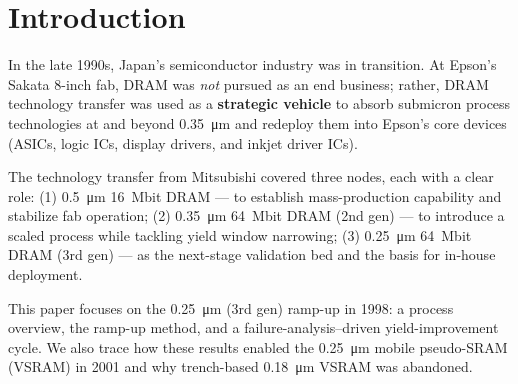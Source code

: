 \section{Introduction}

In the late 1990s, Japan's semiconductor industry was in transition. At Epson's Sakata 8-inch fab, DRAM was \emph{not} pursued as an end business; rather, DRAM technology transfer was used as a \textbf{strategic vehicle} to absorb submicron process technologies at and beyond 0.35~\si{\micro\meter} and redeploy them into Epson's core devices (ASICs, logic ICs, display drivers, and inkjet driver ICs).

The technology transfer from Mitsubishi covered three nodes, each with a clear role:
(1) 0.5~\si{\micro\meter} 16~Mbit DRAM --- to establish mass-production capability and stabilize fab operation; 
(2) 0.35~\si{\micro\meter} 64~Mbit DRAM (2nd gen) --- to introduce a scaled process while tackling yield window narrowing; 
(3) 0.25~\si{\micro\meter} 64~Mbit DRAM (3rd gen) --- as the next-stage validation bed and the basis for in-house deployment.

This paper focuses on the 0.25~\si{\micro\meter} (3rd gen) ramp-up in 1998: a process overview, the ramp-up method, and a failure-analysis–driven yield-improvement cycle. We also trace how these results enabled the 0.25~\si{\micro\meter} mobile pseudo-SRAM (VSRAM) in 2001 and why trench-based 0.18~\si{\micro\meter} VSRAM was abandoned.
